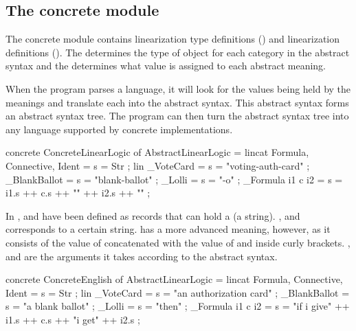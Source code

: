 \subsection{The concrete module}
\label{03_02_02}

The concrete module contains linearization type definitions () and linearization definitions (). The  determines the type of object for each category in the abstract syntax and the  determines what value is assigned to each abstract meaning. 

When the program parses a language, it will look for the values being held by the meanings and translate each into the abstract syntax. This abstract syntax forms an abstract syntax tree. The program can then turn the abstract syntax tree into any language supported by concrete implementations.

\begin{lstgf}
concrete ConcreteLinearLogic of AbstractLinearLogic = {
    lincat 
        Formula, Connective, Ident = {s = Str} ;
    lin 
        _VoteCard = {s = "voting-auth-card"} ;
        _BlankBallot = {s = "blank-ballot"} ;
        _Lolli = {s = "-o"} ;
        _Formula i1 c i2 = {s = i1.s ++ c.s ++ "{" ++ i2.s ++ "}"} ;
}
\end{lstgf}

In  ,  and  have been defined as records that can hold a  (a string). ,  and  corresponds to a certain string. 
 has a more advanced meaning, however, as it consists of the value of  concatenated with the value of  and  inside curly brackets. ,  and  are the arguments it takes according to the abstract syntax.

\begin{lstgf}
concrete ConcreteEnglish of AbstractLinearLogic = {
    lincat 
        Formula, Connective, Ident = {s = Str} ;
    lin 
        _VoteCard = {s = "an authorization card"} ;
        _BlankBallot = {s = "a blank ballot"} ;
        _Lolli = {s = "then"} ;
        _Formula i1 c i2 = {s = "if i give" ++ i1.s ++ c.s ++ "i get" ++ i2.s} ;
}
\end{lstgf}

